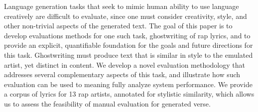 Language generation tasks that seek to mimic human ability to use language creatively are difficult to evaluate, since one must consider creativity, style, and other non-trivial aspects of the generated text. The goal of this paper is to develop evaluations methods for one such task, ghostwriting of rap lyrics, and to provide an explicit, quantifiable foundation for the goals and future directions for this task. Ghostwriting must produce text that is similar in style to the emulated artist, yet distinct in content. We develop a novel evaluation methodology that addresses several complementary aspects of this task, and illustrate how such evaluation can be used to meaning fully analyze system performance. We provide a corpus of lyrics for 13 rap artists, annotated for stylistic similarity, which allows us to assess the feasibility of manual evaluation for generated verse.
